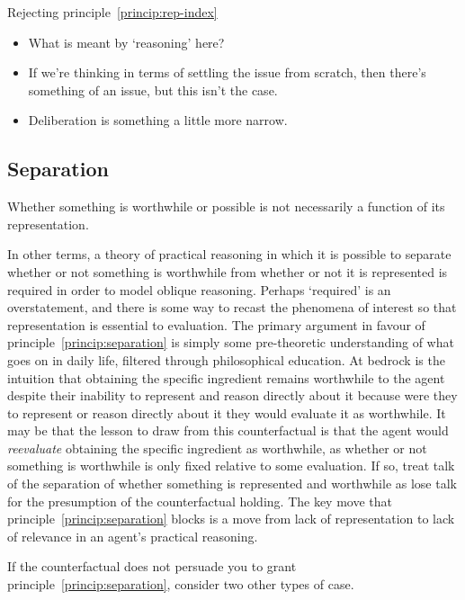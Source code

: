 \documentclass[10pt]{article}
\begin{document}
Rejecting principle~\ref{princip:rep-index} 



\begin{itemize}
\item What is meant by `reasoning' here?
\item If we're thinking in terms of settling the issue from scratch, then there's something of an issue, but this isn't the case.
\item Deliberation is something a little more narrow.
\end{itemize}



\subsection{Separation}
\label{sec:separation}

\begin{principle}\label{princip:separation}
  Whether something is worthwhile or possible is not necessarily a function of its representation.
\end{principle}
In other terms, a theory of practical reasoning in which it is possible to separate whether or not something is worthwhile from whether or not it is represented is required in order to model {\color{blue} oblique reasoning}.
Perhaps `required' is an overstatement, and there is some way to recast the phenomena of interest so that representation is essential to evaluation.
The primary argument in favour of principle~\ref{princip:separation} is simply some pre-theoretic understanding of what goes on in daily life, filtered through philosophical education.
At bedrock is the intuition that obtaining the specific ingredient remains worthwhile to the agent despite their inability to represent and reason directly about it because were they to represent or reason directly about it they would evaluate it as worthwhile.
It may be that the lesson to draw from this counterfactual is that the agent would \emph{reevaluate} obtaining the specific ingredient as worthwhile, as whether or not something is worthwhile is only fixed relative to some evaluation.
If so, treat talk of the separation of whether something is represented and worthwhile as lose talk for the presumption of the counterfactual holding.
The key move that principle~\ref{princip:separation} blocks is a move from lack of representation to lack of relevance in an agent's practical reasoning.

If the counterfactual does not persuade you to grant principle~\ref{princip:separation}, consider two other types of case.
\end{document}
